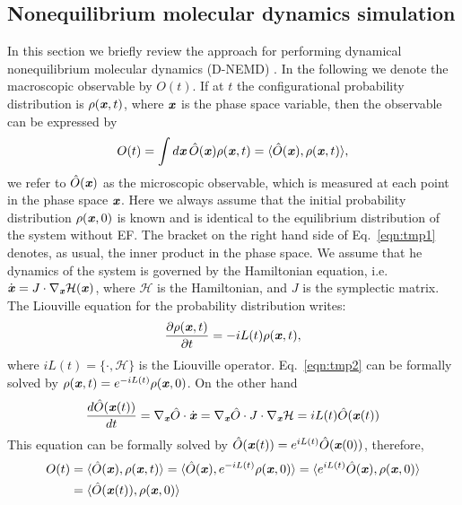 \documentclass[a4paper,preprint,unsortedaddress,onecolumn]{revtex4-1}
\newcommand{\vect}[1]{\textbf{\textit{#1}}}
\begin{document}
\subsection{Nonequilibrium molecular dynamics simulation}
In this section we briefly review the approach for performing dynamical nonequilibrium
molecular dynamics (D-NEMD) \cite{ciccotti1975direct, ciccotti1979thought,
  orlandini2011hydrodynamics, orlandini2011hydrodynamics-01}.
In the following we denote the macroscopic observable by $O(t)$. If at $t$
the configurational probability distribution is $\rho(\vect x, t)$, where
$\vect x$ is the phase space variable, then the observable can be
expressed by
\begin{align}\label{eqn:tmp1}
  O(t) = \int d\vect x\, \hat O(\vect x)\rho(\vect x, t)  = \langle \hat O(\vect x), \rho(\vect x, t)\rangle,
\end{align}
we refer to $\hat O (\vect x)$ as the microscopic observable, 
which is measured at each point in the phase space $\vect x$.
Here we always assume that the initial probability distribution
$\rho(\vect x, 0)$ is known and is identical to the equilibrium distribution of the system
without EF.
The bracket on the right hand side of Eq.~\eqref{eqn:tmp1} denotes, as usual, the inner product in the
phase space.  We assume that he dynamics of the system is governed by the
Hamiltonian equation, i.e. $\dot {\vect x} = J \cdot \nabla_{\vect x}
\mathcal H(\vect x)$, where $\mathcal H$ is the Hamiltonian, and $J$ is
the symplectic matrix. The Liouville equation for the probability
distribution writes:
\begin{align}\label{eqn:tmp2}
  \frac{\partial \rho(\vect x, t)}{\partial t} = - iL(t) \rho(\vect x, t),
\end{align}
where $iL(t) = \{\cdot, \mathcal H\}$ is the Liouville operator.
Eq.~\eqref{eqn:tmp2}
can be formally solved by $\rho(\vect x, t) = e^{-iL(t)} \rho(\vect x, 0)$.
On the other hand
\begin{align}
  \frac{d \hat O(\vect x(t))}{dt} = \nabla_{\vect x}\hat O\cdot \dot{\vect x}
  = \nabla_{\vect x}\hat O\cdot J\cdot \nabla_{\vect x}\mathcal H
  = iL(t) \hat O (\vect x(t))
\end{align}
This equation can be formally solved by $\hat O(\vect x(t)) = e^{iL(t)} \hat O(\vect x(0))$, therefore,
\begin{align}\nonumber
  O(t) & = \langle \hat O(\vect x), \rho(\vect x, t)\rangle
  = \langle \hat O(\vect x), e^{-iL(t)} \rho(\vect x, 0)\rangle
  = \langle e^{iL(t)}\hat O(\vect x), \rho(\vect x, 0)\rangle\\\label{eqn:tmp4}
  &= \langle \hat O(\vect x(t)), \rho(\vect x, 0)\rangle
\end{align}
\end{document}

